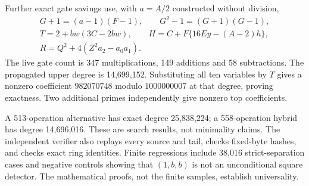 Further exact gate savings use, with $a=A/2$ constructed without division,
\begin{gather*}
 G+1=(a-1)(F-1),\qquad G^2-1=(G+1)(G-1),\\
 T=2+bw(3C-2bw),\qquad
 H=C+F\{16Ey-(A-2)h\},\\
 R=Q^2+4(Z^2a_2-a_0a_1).
\end{gather*}
The live gate count is 347 multiplications, 149 additions and 58
subtractions. The propagated upper degree is 14,699,152. Substituting
all ten variables by $T$ gives a nonzero coefficient
$982070748$ modulo $1000000007$ at that degree, proving exactness.
Two additional primes independently give nonzero top coefficients.

A 513-operation alternative has exact degree 25,838,224; a 558-operation
hybrid has degree 14,696,016. These are search results, not minimality
claims. The independent verifier also replays every source and tail,
checks fixed-byte hashes, and checks exact ring identities. Finite
regressions include 38,016 strict-separation cases and negative controls
showing that $(1,b,b)$ is not an unconditional square detector.
The mathematical proofs, not the finite samples, establish universality.
